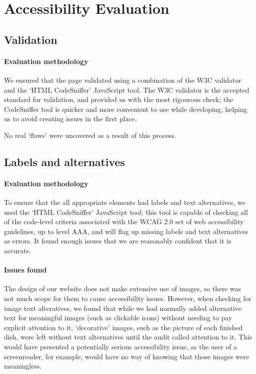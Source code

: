 \section{Accessibility Evaluation}

\subsection{Validation}

\paragraph{Evaluation methodology}
We ensured that the page validated using a combination of the W3C
validator and the
`HTML CodeSniffer' JavaScript tool. The W3C
validator is the accepted standard for validation, and provided us
with the most rigourous check; the CodeSniffer tool is quicker and
more convenient to use while developing, helping us to avoid creating
issues in the first place.

No real `flaws' were uncovered as a result of this process.

\subsection{Labels and alternatives}

\paragraph{Evaluation methodology}
To ensure that the all appropriate elements had labels and text
alternatives, we used the `HTML CodeSniffer' JavaScript tool; this
tool is capable of checking all of the code-level criteria associated
with the WCAG 2.0 set of web accessibility guidelines, up to level AAA, and will flag up missing labels and
text alternatives as errors. It found enough issues that we are
reasonably confident that it is accurate.

\paragraph{Issues found}
The design of our website does not make extensive use of images, so
there was not much scope for them to cause accessibility
issues. However, when checking for image text alteratives, we found
that while we had normally added alternative text for meaningful
images (such as clickable icons) without needing to pay explicit
attention to it, `decorative' images, such as the picture of each
finished dish, were left without text alternatives until the audit
called attention to it. This would have presented a potentially
serious accessibility issue, as the user of a screenreader, for
example, would have no way of knowing that those images were
meaningless.

